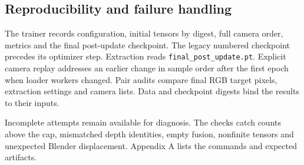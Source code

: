\subsection{Reproducibility and failure handling}
The trainer records configuration, initial tensors by digest, full camera order, metrics and the final post-update checkpoint. The legacy numbered checkpoint precedes its optimizer step. Extraction reads \texttt{final\_post\_update.pt}. Explicit camera replay addresses an earlier change in sample order after the first epoch when loader workers changed. Pair audits compare final RGB target pixels, extraction settings and camera lists. Data and checkpoint digests bind the results to their inputs.

Incomplete attempts remain available for diagnosis. The checks catch counts above the cap, mismatched depth identities, empty fusion, nonfinite tensors and unexpected Blender displacement. Appendix A lists the commands and expected artifacts.

